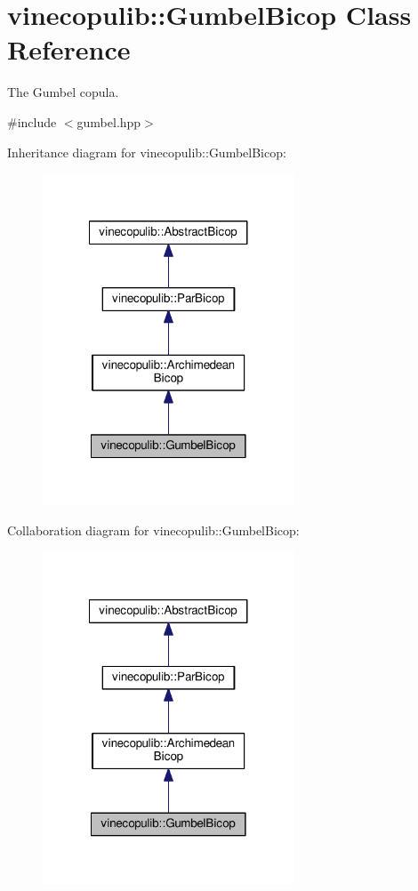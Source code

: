 \hypertarget{classvinecopulib_1_1_gumbel_bicop}{\section{vinecopulib\+:\+:Gumbel\+Bicop Class Reference}
\label{classvinecopulib_1_1_gumbel_bicop}
}


The Gumbel copula.  




{\ttfamily \#include $<$gumbel.\+hpp$>$}



Inheritance diagram for vinecopulib\+:\+:Gumbel\+Bicop\+:\nopagebreak
\begin{figure}[H]
\begin{center}
\leavevmode
\includegraphics[width=212pt]{classvinecopulib_1_1_gumbel_bicop__inherit__graph}
\end{center}
\end{figure}


Collaboration diagram for vinecopulib\+:\+:Gumbel\+Bicop\+:\nopagebreak
\begin{figure}[H]
\begin{center}
\leavevmode
\includegraphics[width=212pt]{classvinecopulib_1_1_gumbel_bicop__coll__graph}
\end{center}
\end{figure}

